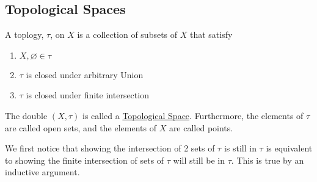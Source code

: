 \subsection{Topological Spaces}

\begin{definition}
    A toplogy, $\tau$, on $X$ is a collection of subsets of $X$ that satisfy
    \begin{enumerate}
        \item $X,\varnothing\in\tau$
        \item $\tau$ is closed under arbitrary Union
        \item $\tau$ is closed under finite intersection
    \end{enumerate}
    The double $(X,\tau)$ is called a \href{https://en.wikipedia.org/wiki/Topological_space}{Topological Space}. Furthermore, the elements of $\tau$ are called open sets, and the elements of $X$ are called points.
\end{definition}
We first notice that showing the intersection of 2 sets of $\tau$ is still in $\tau$ is equivalent to showing the finite intersection of sets of $\tau$ will still be in $\tau$. This is true by an inductive argument.

